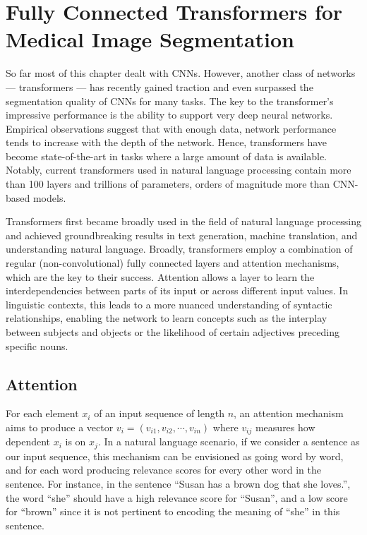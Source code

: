 \section{Fully Connected Transformers for Medical Image Segmentation}

So far most of this chapter dealt with CNNs. However, another class of networks --- transformers \cite{attnAllYouNeed} --- has recently gained traction and even surpassed the segmentation quality of CNNs for many tasks. The key to the transformer's impressive performance is the ability to support very deep neural networks. Empirical observations suggest that with enough data, network performance tends to increase with the depth of the network. Hence, transformers have become state-of-the-art in tasks where a large amount of data is available. Notably, current transformers used in natural language processing contain more than 100 layers and trillions of parameters, orders of magnitude more than CNN-based models.

Transformers first became broadly used in the field of natural language processing and achieved groundbreaking results in text generation, machine translation, and understanding natural language. Broadly, transformers employ a combination of regular (non-convolutional) fully connected layers and attention mechanisms, which are the key to their success. Attention allows a layer to learn the interdependencies between parts of its input or across different input values. In linguistic contexts, this leads to a more nuanced understanding of syntactic relationships, enabling the network to learn concepts such as the interplay between subjects and objects or the likelihood of certain adjectives preceding specific nouns.

\subsection{Attention}

For each element $x_i$ of an input sequence of length $n$, an attention mechanism aims to produce a vector $v_i = (v_{i1}, v_{i2}, \cdots, v_{in})$ where $v_{ij}$ measures how dependent $x_i$ is on $x_j$. In a natural language scenario, if we consider a sentence as our input sequence, this mechanism can be envisioned as going word by word, and for each word producing relevance scores for every other word in the sentence. For instance, in the sentence ``Susan has a brown dog that she loves.'', the word ``she'' should have a high relevance score for ``Susan'', and a low score for ``brown'' since it is not pertinent to encoding the meaning of ``she'' in this sentence.

